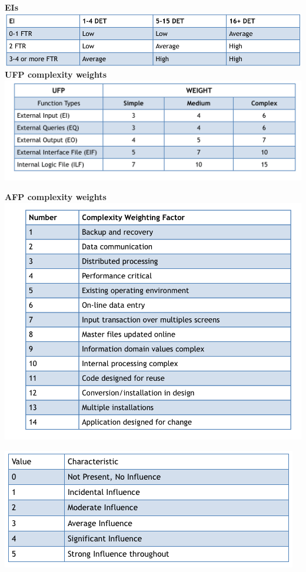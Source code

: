 \documentclass{article}
\begin{document}
\begin{flushleft}
\textbf{EIs}\\
\vspace{0.5cm}
\includegraphics[scale=0.3]{s13}
\vspace{0.5cm}
\newpage
\textbf{UFP complexity weights}\\
\vspace{0.5cm}
\includegraphics[scale=0.3]{s2}
\vspace{0.5cm}

\textbf{AFP complexity weights}\\
\vspace{0.5cm}
\includegraphics[scale=0.3]{s3}
\vspace{0.5cm}


\includegraphics[scale=0.6]{s4}
\vspace{0.5cm}




\end{flushleft}
\end{document}
